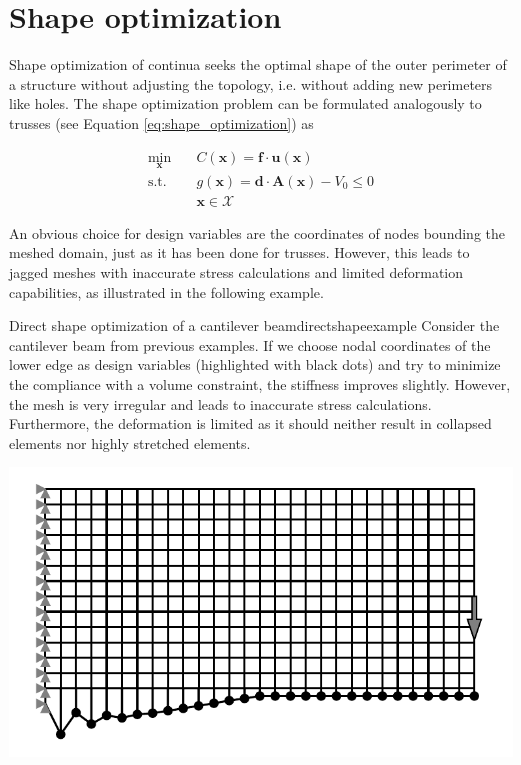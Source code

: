 
\section{Shape optimization}
Shape optimization of continua seeks the optimal shape of the outer perimeter of a structure without adjusting the topology, i.e. without adding new perimeters like holes. The shape optimization problem can be formulated analogously to trusses (see Equation \eqref{eq:shape_optimization}) as 

\begin{equation}
    \begin{aligned}
        \min_{\mathbf{x}} \quad & C(\mathbf{x}) = \mathbf{f} \cdot \mathbf{u}(\mathbf{x})\\
        \textrm{s.t.} \quad & g(\mathbf{x}) = \mathbf{d} \cdot \mathbf{A}(\mathbf{x}) - V_0 \le 0  \\
                            & \mathbf{x} \in \mathcal{X}
    \end{aligned}
    \label{eq:shape_optimization_continuum}
\end{equation}

An obvious choice for design variables are the coordinates of nodes bounding the meshed domain, just as it has been done for trusses. However, this leads to jagged meshes with inaccurate stress calculations and limited deformation capabilities, as illustrated in the following example.

\begin{example}{Direct shape optimization of a cantilever beam}{directshapeexample}   
    Consider the cantilever beam from previous examples. If we choose nodal coordinates of the lower edge as design variables (highlighted with black dots) and try to minimize the compliance with a volume constraint, the stiffness improves slightly. However, the mesh is very irregular and leads to inaccurate stress calculations. Furthermore, the deformation is limited as it should neither result in collapsed elements nor highly stretched elements. 
    \begin{center}
        \includegraphics[width=0.9\linewidth]{figures/cantilever_fem_naive_shape.pdf}
    \end{center}
\end{example}

